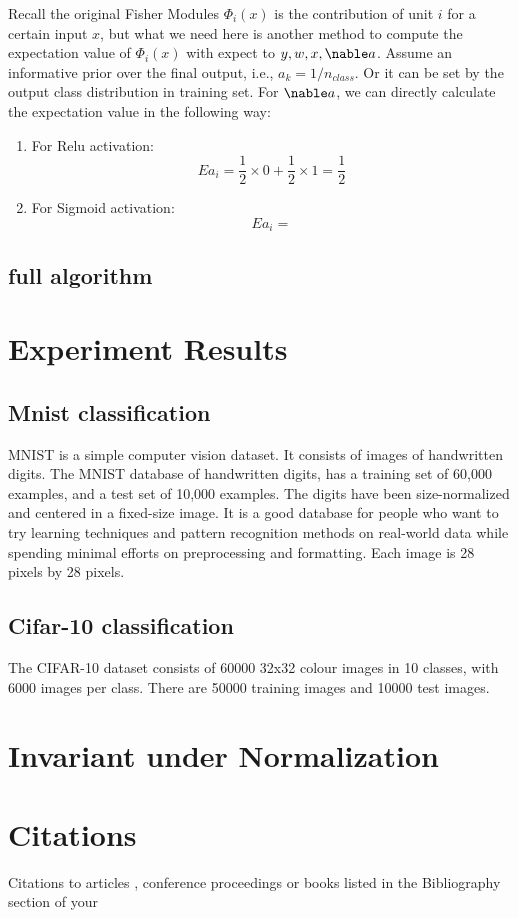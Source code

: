 \documentclass{sig-alternate}
\begin{document}
    Recall the original Fisher Modules $\Phi_i(x)$ is the contribution of unit $i$ for a certain input $x$, but what we need here is another method to compute the expectation value of $\Phi_i(x)$ with expect to $y, w, x, \nable a$. Assume an informative prior over the final output, i.e., $a_k = 1/n_{class}$. Or it can be set by the output class distribution in training set. For $\nable a$, we can directly calculate the expectation value in the following way:
    \begin{enumerate}
        \item For Relu activation:
            \begin{equation}
            Ea_i = \frac{1}{2} \times 0 + \frac{1}{2} \times 1 = \frac{1}{2}
            \end{equation}
        \item For Sigmoid activation:
            \begin{equation}
            Ea_i = 
            \end{equation}
    \end{enumerate}

    
    \subsection{full algorithm}
\section{Experiment Results}
    \subsection{Mnist classification}
    MNIST is a simple computer vision dataset. It consists of images of handwritten digits. The MNIST database of handwritten digits, has a training set of 60,000 examples, and a test set of 10,000 examples. The digits have been size-normalized and centered in a fixed-size image. It is a good database for people who want to try learning techniques and pattern recognition methods on real-world data while spending minimal efforts on preprocessing and formatting. Each image is 28 pixels by 28 pixels.
    
    \subsection{Cifar-10 classification}
    The CIFAR-10 dataset consists of 60000 32x32 colour images in 10 classes, with 6000 images per class. There are 50000 training images and 10000 test images. 
\section{Invariant under Normalization}
\section{Citations}
    Citations to articles \cite{bowman:reasoning,
    clark:pct, braams:babel, herlihy:methodology},
    conference proceedings \cite{clark:pct} or
    books \cite{salas:calculus, Lamport:LaTeX} listed
    in the Bibliography section of your

 
\end{document}
